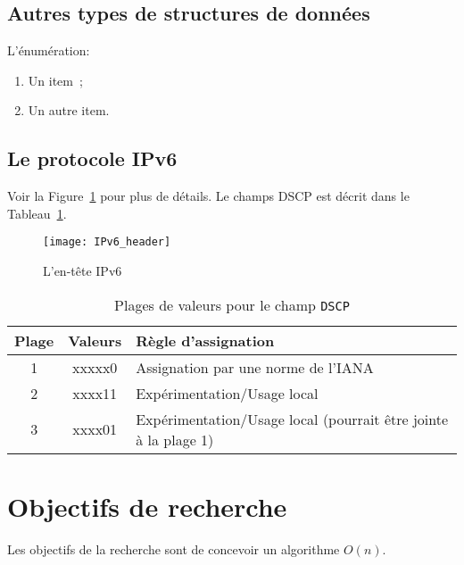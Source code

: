 \subsection{Autres types de structures de données}
L'énumération:
\begin{enumerate}
\item Un item~;
\item Un autre item.
\end{enumerate}


\subsection{Le protocole IPv6}
Voir la Figure~\ref{fig:IPv6} pour plus de détails. Le champs DSCP est
décrit dans le Tableau~\ref{tab:RangesDSCP}.

\begin{figure}[htb]
\centering
\texttt{[image: IPv6\_header]}
\caption{L'en-tête IPv6}
\label{fig:IPv6}
\end{figure}

\begin{table}[ht]
\caption{Plages de valeurs pour le champ \texttt{DSCP}}
\centering
\begin{tabular}{|c|c|l|}
\hline\rowcolor[gray]{0.8}\color{black}
Plage & Valeurs & Règle d'assignation\\\hline
1 & xxxxx0 & Assignation par une norme de l'IANA\\\hline
2 & xxxx11 & Expérimentation/Usage local\\\hline
3 & xxxx01 & Expérimentation/Usage local (pourrait être jointe à la plage 1)\\\hline
\end{tabular}
\label{tab:RangesDSCP}
\end{table}

\FloatBarrier


\section{Objectifs de recherche}  %
Les objectifs de la recherche sont de concevoir un algorithme $O(n)$.


